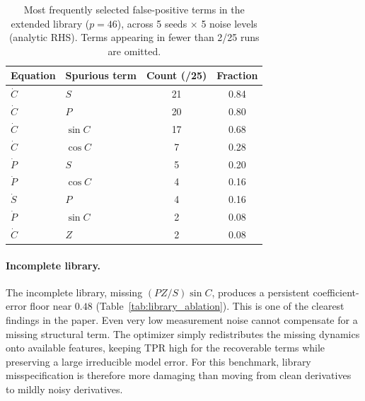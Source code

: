 \documentclass[12pt]{article}
\begin{document}
\begin{table}[t]
\centering
\caption{Most frequently selected false-positive terms in the extended library ($p=46$), across 5 seeds $\times$ 5 noise levels (analytic RHS). Terms appearing in fewer than 2/25 runs are omitted.}
\label{tab:false_positives}
\small
\begin{tabular}{llcc}
\toprule
Equation & Spurious term & Count (/25) & Fraction \\
\midrule
$\dot{C}$ & $S$       & 21 & 0.84 \\
$\dot{C}$ & $P$       & 20 & 0.80 \\
$\dot{C}$ & $\sin C$  & 17 & 0.68 \\
$\dot{C}$ & $\cos C$  &  7 & 0.28 \\
$\dot{P}$ & $S$       &  5 & 0.20 \\
$\dot{P}$ & $\cos C$  &  4 & 0.16 \\
$\dot{S}$ & $P$       &  4 & 0.16 \\
$\dot{P}$ & $\sin C$  &  2 & 0.08 \\
$\dot{C}$ & $Z$       &  2 & 0.08 \\
\bottomrule
\end{tabular}
\end{table}

\paragraph{Incomplete library.}
The incomplete library, missing $(PZ/S)\sin C$, produces a persistent coefficient-error floor near $0.48$ (Table~\ref{tab:library_ablation}).
This is one of the clearest findings in the paper.
Even very low measurement noise cannot compensate for a missing structural term.
The optimizer simply redistributes the missing dynamics onto available features, keeping TPR high for the recoverable terms while preserving a large irreducible model error.
For this benchmark, library misspecification is therefore more damaging than moving from clean derivatives to mildly noisy derivatives.
\end{document}
